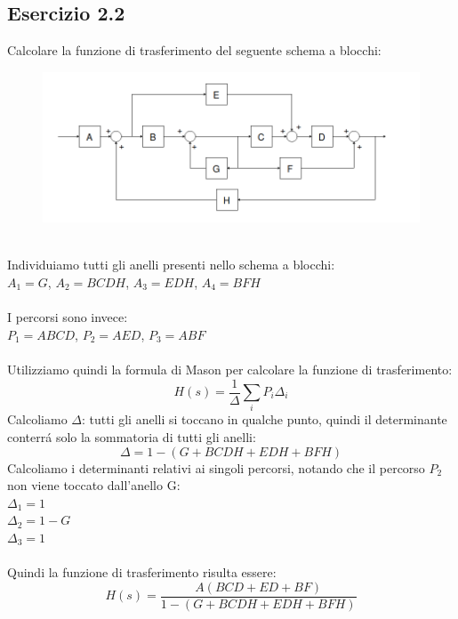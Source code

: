 \documentclass[12pt,a4paper]{article}
\begin{document}
	\subsection*{Esercizio 2.2}
	Calcolare la funzione di trasferimento del seguente schema a blocchi:
	\begin{figure}[h!]
		\centering
		\includegraphics[scale=0.5]{./images/schema22.png}
	\end{figure}
    \\
	Individuiamo tutti gli anelli presenti nello schema a blocchi:\\
	$A_1 = G$, \quad $A_2 = BCDH$, \quad $A_3 = EDH$, \quad $A_4 = BFH$\\ \\
	I percorsi sono invece:\\
	$P_1 = ABCD$, \quad $P_2 = AED$, \quad $P_3 = ABF$\\ \\
	Utilizziamo quindi la formula di Mason per calcolare la funzione di trasferimento:
	\[
		H(s) = \frac{1}{\Delta}\sum_i P_i \Delta_i
	\]
	Calcoliamo $\Delta$: tutti gli anelli si toccano in qualche punto, quindi il determinante conterr\'a solo la sommatoria di tutti gli anelli:
	\[
		\Delta = 1 - (G + BCDH + EDH + BFH)
	\]
	Calcoliamo i determinanti relativi ai singoli percorsi, notando che il percorso $P_2$ non viene toccato dall'anello G:\vspace{5px}\\
	$\Delta_1 = 1$\\
	$\Delta_2 = 1-G$ \\
	$\Delta_3 = 1$ \\ \\
	Quindi la funzione di trasferimento risulta essere:
	\[
		H(s) = \frac{A(BCD + ED + BF)}{1 - (G + BCDH + EDH + BFH)}
	\]
	\newpage
\end{document}
